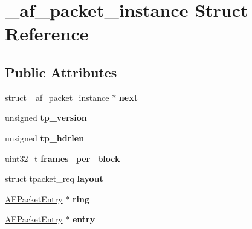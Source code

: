 \hypertarget{struct__af__packet__instance}{
\section{\_\-af\_\-packet\_\-instance Struct Reference}
\label{struct__af__packet__instance}
}
\subsection*{Public Attributes}
\begin{DoxyCompactItemize}
\item 
\hypertarget{struct__af__packet__instance_a4ac19da578006788541acc80ed794a0b}{
struct \hyperlink{struct__af__packet__instance}{\_\-af\_\-packet\_\-instance} $\ast$ {\bfseries next}}
\label{struct__af__packet__instance_a4ac19da578006788541acc80ed794a0b}

\item 
\hypertarget{struct__af__packet__instance_ac3e2583bc2f7f00be4e5a88f131646d6}{
unsigned {\bfseries tp\_\-version}}
\label{struct__af__packet__instance_ac3e2583bc2f7f00be4e5a88f131646d6}

\item 
\hypertarget{struct__af__packet__instance_a0c3757351d5291c7a55ce430068c7b3c}{
unsigned {\bfseries tp\_\-hdrlen}}
\label{struct__af__packet__instance_a0c3757351d5291c7a55ce430068c7b3c}

\item 
\hypertarget{struct__af__packet__instance_a9ff1524441c5eafc79694c9ef3ba7599}{
uint32\_\-t {\bfseries frames\_\-per\_\-block}}
\label{struct__af__packet__instance_a9ff1524441c5eafc79694c9ef3ba7599}

\item 
\hypertarget{struct__af__packet__instance_a4184b03f853a70aa2bc810dea217e62e}{
struct tpacket\_\-req {\bfseries layout}}
\label{struct__af__packet__instance_a4184b03f853a70aa2bc810dea217e62e}

\item 
\hypertarget{struct__af__packet__instance_abdc1a42a0b4028c51f18b3cc593a8371}{
\hyperlink{struct__af__packet__entry}{AFPacketEntry} $\ast$ {\bfseries ring}}
\label{struct__af__packet__instance_abdc1a42a0b4028c51f18b3cc593a8371}

\item 
\hypertarget{struct__af__packet__instance_aac9db2f156785db8a62a8086e3521a2c}{
\hyperlink{struct__af__packet__entry}{AFPacketEntry} $\ast$ {\bfseries entry}}
\label{struct__af__packet__instance_aac9db2f156785db8a62a8086e3521a2c}


\end{DoxyCompactItemize}
